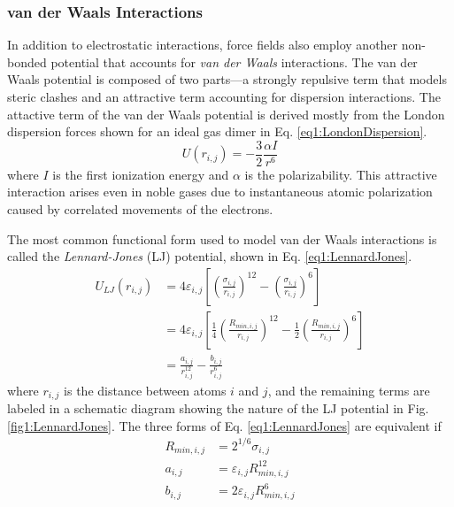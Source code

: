 \subsubsection{van der Waals Interactions}
\label{sec1:MMVDW}

In addition to electrostatic interactions, force fields also employ another
non-bonded potential that accounts for \emph{van der Waals} interactions. The
van der Waals potential is composed of two parts---a strongly repulsive term
that models steric clashes and an attractive term accounting for dispersion
interactions.  The attactive term of the van der Waals potential is derived
mostly from the London dispersion forces shown for an ideal gas dimer in Eq.
\ref{eq1:LondonDispersion}. \cite{McQuarrie_Book_PhysChem_1997}
\begin{equation}
   U(r_{i,j}) = - \frac 3 2 \frac {\alpha I} {r ^ 6}
   \label{eq1:LondonDispersion}
\end{equation}
where $I$ is the first ionization energy and $\alpha$ is the polarizability.
This attractive interaction arises even in noble gases due to instantaneous
atomic polarization caused by correlated movements of the electrons.

The most common functional form used to model van der Waals interactions is
called the \emph{Lennard-Jones} (LJ) potential, shown in Eq.
\ref{eq1:LennardJones}.
\begin{align}
   U_{LJ} (r_{i,j}) & = 4 \varepsilon_{i,j} \left [ \left ( \frac {\sigma_{i,j}}
      {r_{i,j}} \right ) ^ {12} - \left ( \frac {\sigma_{i,j}} {r_{i,j}} 
      \right ) ^ 6 \right ] \nonumber \\
                    & = 4 \varepsilon_{i,j} \left [ \frac 1 4 \left ( \frac
      {R_{min,i,j}} {r_{i,j}} \right ) ^ {12} - \frac 1 2 \left (
      \frac{R_{min,i,j}} {r_{i,j}} \right ) ^ 6 \right ]
      \label{eq1:LennardJones} \\
                    & = \frac {a_{i,j}} {r_{i,j} ^ {12}} - \frac {b_{i,j}}
      {r_{i,j} ^ 6} \nonumber
\end{align}
where $r_{i,j}$ is the distance between atoms $i$ and $j$, and the remaining
terms are labeled in a schematic diagram showing the nature of the LJ potential
in Fig. \ref{fig1:LennardJones}. The three forms of Eq. \ref{eq1:LennardJones}
are equivalent if
\begin{eqnarray*}
   R_{min,i,j} & = 2 ^ {1/6} \sigma _ {i,j} \\
   a_{i,j} & = \varepsilon _ {i,j} R_{min,i,j} ^ {12} \\
   b_{i,j} & = 2 \varepsilon _ {i,j} R_{min,i,j} ^ 6
\end{eqnarray*}

